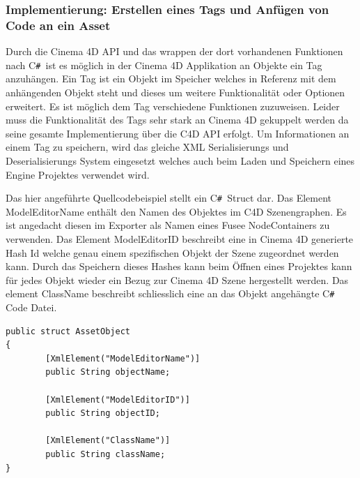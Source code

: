 \documentclass[pagesize, paper=a4, fontsize=12pt, titlepage=true, headings=small, headnosepline, abstractoff, liststotoc, nochapterprefix, plainheadsepline, twoside]{scrreprt}
\newcommand{\CSS}{C\texttt{\# }}
\begin{document}
\subsubsection{Implementierung: Erstellen eines Tags und Anfügen von Code an ein Asset}
Durch die Cinema 4D API und das wrappen der dort vorhandenen Funktionen nach \CSS ist es möglich in der Cinema 4D Applikation an Objekte ein Tag anzuhängen. Ein Tag ist ein Objekt im Speicher welches in Referenz mit dem anhängenden Objekt steht und dieses um weitere Funktionalität oder Optionen erweitert. Es ist möglich dem Tag verschiedene Funktionen zuzuweisen. Leider muss die Funktionalität des Tags sehr stark an Cinema 4D gekuppelt werden da seine gesamte Implementierung über die C4D API erfolgt.
Um Informationen an einem Tag zu speichern, wird das gleiche XML Serialisierungs und Deserialisierungs System eingesetzt welches auch beim Laden und Speichern eines Engine Projektes verwendet wird.

Das hier angeführte Quellcodebeispiel stellt ein \CSS Struct dar. Das Element ModelEditorName enthält den Namen des Objektes im C4D Szenengraphen. Es ist angedacht diesen im Exporter als Namen eines Fusee NodeContainers zu verwenden. Das Element ModelEditorID beschreibt eine in Cinema 4D generierte Hash Id welche genau einem spezifischen Objekt der Szene zugeordnet werden kann. Durch das Speichern dieses Hashes kann beim Öffnen eines Projektes kann für jedes Objekt wieder ein Bezug zur Cinema 4D Szene hergestellt werden. Das element ClassName beschreibt schliesslich eine an das Objekt angehängte \CSS Code Datei.
\begin{lstlisting}[label=ToolState, caption=Asset Informationsspeicher Objekt. Kann zu XML serialisiert werden.]
public struct AssetObject
{
        [XmlElement("ModelEditorName")]
        public String objectName;

        [XmlElement("ModelEditorID")]
        public String objectID;

        [XmlElement("ClassName")]
        public String className; 
}
\end{lstlisting}
\end{document}
